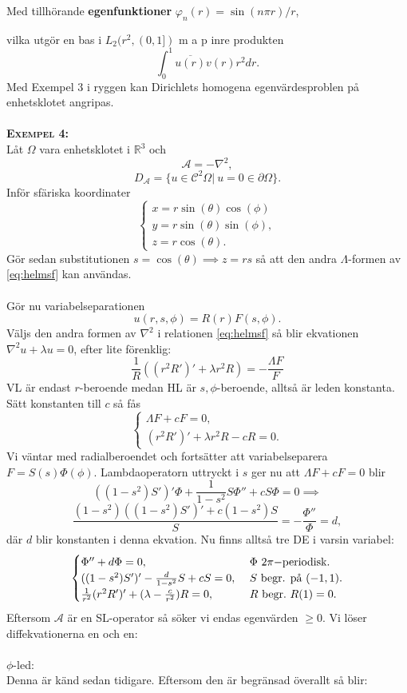 \documentclass{article}
\begin{document}
Med tillhörande \textbf{egenfunktioner} $\varphi_n(r)=\sin(n\pi r)/r$,

vilka utgör en bas i $L_2(r^2,(0,1])$ m a p inre produkten
$$
\int_0^1\overline{u(r)}v(r)r^2dr.
$$
\newpage
\noindent
Med Exempel 3 i ryggen kan Dirichlets homogena egenvärdesproblen på enhetsklotet angripas.\\ \\
\textbf{\textsc{Exempel 4:}}\\
Låt $\Omega$ vara enhetsklotet i $\mathbb{R}^3$ och 
$$
\mathcal{A}=-\nabla^2,
$$
$$
D_{\mathcal{A}}=\{u\in\mathcal{C}^2{\Omega}| \ u=0\in\partial\Omega\}.
$$
Inför sfäriska koordinater
\begin{equation*}
    \begin{cases}
       x=r\sin(\theta)\cos(\phi)\\
       y=r\sin(\theta)\sin(\phi),\\
       z=r\cos(\theta).
    \end{cases}
\end{equation*}
Gör sedan substitutionen $s=\cos(\theta)\implies z=rs$ så att den andra $\Lambda$-formen av \eqref{eq:helmsf} kan användas.\\ \\
Gör nu variabelseparationen
$$
u(r,s,\phi)=R(r)F(s,\phi).
$$
Väljs den andra formen av $\nabla^2$ i relationen \eqref{eq:helmsf} så blir ekvationen $\nabla^2u+\lambda u=0$, efter lite förenklig:
$$
\frac{1}{R}((r^2R')'+\lambda r^2R)=-\frac{\Lambda F}{F}
$$
VL är endast $r$-beroende medan HL är $s,\phi$-beroende, alltså är leden konstanta. Sätt konstanten till $c$ så fås 
\begin{equation*}
    \begin{cases}
        \Lambda F+cF=0,\\
        (r^2R')'+\lambda r^2R-cR=0.
    \end{cases}
\end{equation*}
Vi väntar med radialberoendet och fortsätter att variabelseparera $F=S(s)\Phi(\phi)$. Lambdaoperatorn uttryckt i $s$ ger nu att $\Lambda F+cF=0$ blir
$$
((1-s^2)S')'\Phi+\frac{1}{1-s^2}S\Phi''+cS\Phi=0 \implies
$$
$$
\frac{(1-s^2)((1-s^2)S')'+c(1-s^2)S}{S}=-\frac{\Phi''}{\Phi}=d,
$$
där $d$ blir konstanten i denna ekvation. Nu finns alltså tre DE i varsin variabel:
\begin{equation}
    \begin{cases}
        \Phi''+d\Phi=0, \quad &\Phi \ 2\pi-$periodisk$.\\
        ((1-s^2)S')'-\frac{d}{1-s^2}S+cS=0, \ &S \ $begr. på$ \ (-1,1).\\
        \frac{1}{r^2}(r^2R')'+(\lambda-\frac{c}{r^2})R=0, \ &R \ $begr$. \ R(1)=0.
    \end{cases}
\end{equation}
Eftersom $\mathcal{A}$ är en SL-operator så söker vi endas egenvärden $\geq0$. Vi löser diffekvationerna en och en:\\ \\
$\phi$-led:\\
Denna är känd sedan tidigare. Eftersom den är begränsad överallt så blir:
\end{document}
